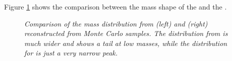Figure \ref{fig:electronAndMuonBMass} shows the comparison between the \Bd mass shape of the \BdKstee and the \BdKstmumu.
\begin{figure}[ht]
  \begin{center}
  \vspace*{-1.0cm}
  \end{center}
  \caption{\textit{Comparison of the \Bd mass distribution from \BdKstee (left) and \BdKstmumu (right) reconstructed from \lhcb Monte Carlo samples. The distribution from  \BdKstee is much wider and shows a tail at low \Bd masses, while the distribution for \BdKstmumu is just a very narrow peak.}}
  \label{fig:electronAndMuonBMass}
\end{figure}


